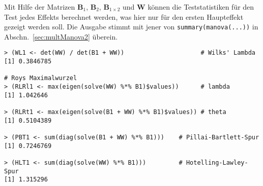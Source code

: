 Mit Hilfe der Matrizen $\bm{B}_{1}$, $\bm{B}_{2}$, $\bm{B}_{1 \times 2}$ und $\bm{W}$ können die Teststatistiken für den Test jedes Effekts berechnet werden, was hier nur für den ersten Haupteffekt gezeigt werden soll. Die Ausgabe stimmt mit jener von \lstinline!summary(manova(...))! in Abschn.\ \ref{sec:multManova2} überein.
\begin{lstlisting}
> (WL1 <- det(WW) / det(B1 + WW))                     # Wilks' Lambda
[1] 0.3846785

# Roys Maximalwurzel
> (RLRl1 <- max(eigen(solve(WW) %*% B1)$values))      # lambda
[1] 1.042646

> (RLRt1 <- max(eigen(solve(B1 + WW) %*% B1)$values)) # theta
[1] 0.5104389

> (PBT1 <- sum(diag(solve(B1 + WW) %*% B1)))    # Pillai-Bartlett-Spur
[1] 0.7246769

> (HLT1 <- sum(diag(solve(WW) %*% B1)))         # Hotelling-Lawley-Spur
[1] 1.315296
\end{lstlisting}


